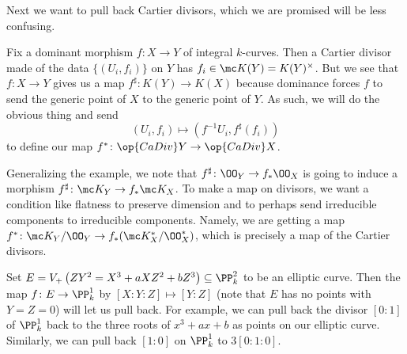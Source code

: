 \documentclass[../notes.tex]{subfiles}
\begin{document}
Next we want to pull back Cartier divisors, which we are promised will be less confusing.
\begin{example}
	Fix a dominant morphism $f\colon X\to Y$ of integral $k$-curves. Then a Cartier divisor made of the data $\{(U_i,f_i)\}$ on $Y$ has $f_i\in\mc K(Y)=K(Y)^\times$. But we see that $f\colon X\to Y$ gives us a map $f^\sharp\colon K(Y)\to K(X)$ because dominance forces $f$ to send the generic point of $X$ to the generic point of $Y$. As such, we will do the obvious thing and send
	\[(U_i,f_i)\mapsto\left(f^{-1}U_i,f^\sharp(f_i)\right)\]
	to define our map $f^*\colon\op{CaDiv}Y\to\op{CaDiv}X$.
\end{example}
Generalizing the example, we note that $f^\sharp\colon\OO_Y\to f_*\OO_X$ is going to induce a morphism $f^\sharp\colon\mc K_Y\to f_*\mc K_X$. To make a map on divisors, we want a condition like flatness to preserve dimension and to perhaps send irreducible components to irreducible components. Namely, we are getting a map $f^*\colon\mc K_Y/\OO_Y\to f_*(\mc K_X^*/\OO_X^*)$, which is precisely a map of the Cartier divisors.
\begin{example}
	Set $E=V_+\left(ZY^2=X^3+aXZ^2+bZ^3\right)\subseteq\PP^2_k$ to be an elliptic curve. Then the map $f\colon E\to\PP^1_k$ by $[X:Y:Z]\mapsto[Y:Z]$ (note that $E$ has no points with $Y=Z=0$) will let us pull back. For example, we can pull back the divisor $[0:1]$ of $\PP^1_k$ back to the three roots of $x^3+ax+b$ as points on our elliptic curve. Similarly, we can pull back $[1:0]$ on $\PP^1_k$ to $3[0:1:0]$.
\end{example}
\end{document}
